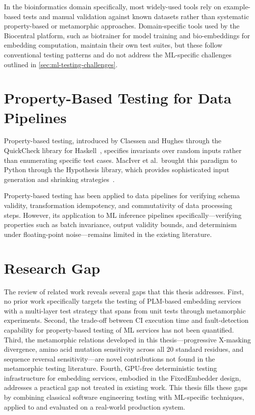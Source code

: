 In the bioinformatics domain specifically, most widely-used tools rely on example-based tests and manual validation against known datasets rather than systematic property-based or metamorphic approaches. Domain-specific tools used by the Biocentral platform, such as biotrainer for model training and bio-embeddings for embedding computation, maintain their own test suites, but these follow conventional testing patterns and do not address the \ac{ML}-specific challenges outlined in \autoref{sec:ml-testing-challenges}.

\section{Property-Based Testing for Data Pipelines}\label{sec:rw-property}

Property-based testing, introduced by Claessen and Hughes through the QuickCheck library for Haskell~\cite{claessen2000quickcheck}, specifies invariants over random inputs rather than enumerating specific test cases. MacIver et al.\ brought this paradigm to Python through the Hypothesis library, which provides sophisticated input generation and shrinking strategies~\cite{maciver2019hypothesis}.

Property-based testing has been applied to data pipelines for verifying schema validity, transformation idempotency, and commutativity of data processing steps. However, its application to \ac{ML} inference pipelines specifically---verifying properties such as batch invariance, output validity bounds, and determinism under floating-point noise---remains limited in the existing literature.

\section{Research Gap}\label{sec:rw-gap}

The review of related work reveals several gaps that this thesis addresses. First, no prior work specifically targets the testing of \ac{PLM}-based embedding services with a multi-layer test strategy that spans from unit tests through metamorphic experiments. Second, the trade-off between \ac{CI} execution time and fault-detection capability for property-based testing of \ac{ML} services has not been quantified. Third, the metamorphic relations developed in this thesis---progressive X-masking divergence, amino acid mutation sensitivity across all 20 standard residues, and sequence reversal sensitivity---are novel contributions not found in the metamorphic testing literature. Fourth, \ac{GPU}-free deterministic testing infrastructure for embedding services, embodied in the FixedEmbedder design, addresses a practical gap not treated in existing work. This thesis fills these gaps by combining classical software engineering testing with \ac{ML}-specific techniques, applied to and evaluated on a real-world production system.
